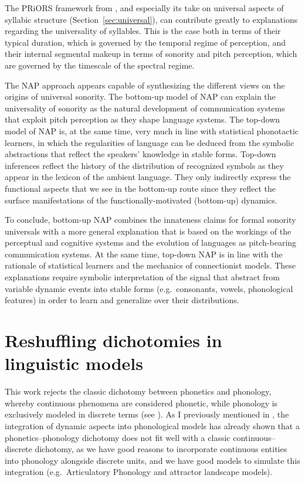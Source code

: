 The PRiORS framework from , and especially its take on universal aspects of syllabic structure (Section~\ref{sec:universal}), can contribute greatly to explanations regarding the universality of syllables. This is the case both in terms of their typical duration, which is governed by the temporal regime of perception, and their internal segmental makeup in terms of sonority and pitch perception, which are governed by the timescale of the spectral regime.

The NAP approach appears capable of synthesizing the different views on the origins of universal sonority.
The bottom-up model of NAP can explain the universality of sonority as the natural development of communication systems that exploit 
pitch
perception as they shape language systems. The top-down model of NAP is, at the same time, very much in line with statistical phonotactic learners, in which the regularities of language can be deduced from the symbolic abstractions that reflect the speakers' knowledge in stable forms.
Top-down inferences reflect the history of the distribution of recognized symbols as they appear in the lexicon of the ambient language. They only indirectly express the functional aspects that we see in the bottom-up route since they reflect the surface manifestations of the functionally-motivated (bottom-up) dynamics.

To conclude, bottom-up NAP combines the innateness claims for formal sonority universals with a more general explanation that is based on the workings of the perceptual and cognitive systems and the evolution of languages as pitch-bearing communication systems. At the same time, top-down NAP is in line with the rationale of statistical learners and the mechanics of connectionist models. These explanations require symbolic interpretation of the signal that abstract from variable dynamic events into stable forms (e.g.~consonants, vowels, phonological features) in order to learn and generalize over their distributions.

\section{Reshuffling dichotomies in linguistic models}\label{sec:dichotomies}
\begin{sloppypar}
This work rejects the classic dichotomy between phonetics and phonology, whereby continuous phenomena are considered phonetic, while phonology is exclusively modeled in discrete terms (see ).
As I previously mentioned in , the integration of dynamic aspects into phonological models has already shown that a phonetics--phonology dichotomy does not fit well with a classic continuous--discrete dichotomy, as we have good reasons to incorporate continuous entities into phonology alongside discrete units, and we have good models to simulate this integration (e.g.~Articulatory Phonology and attractor landscape models).
\end{sloppypar}

